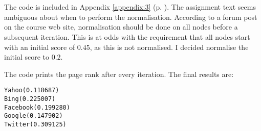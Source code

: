 
\section{}

The code is included in Appendix \ref{appendix:3} (p. \pageref{appendix:3}).
The assignment text seems ambiguous about when to perform the normalisation.
According to a forum post on the course web site\footnotemark, normalisation
should be done on all nodes before a subsequent iteration. This is at odds with
the requirement that all nodes start with an initial score of $0.45$, as this
is not normalised. I decided normalise the initial score to $0.2$.


The code prints the page rank after every iteration. The final results are:

\begin{lstlisting}
Yahoo(0.118687)
Bing(0.225007)
Facebook(0.199280)
Google(0.147902)
Twitter(0.309125)
\end{lstlisting}


